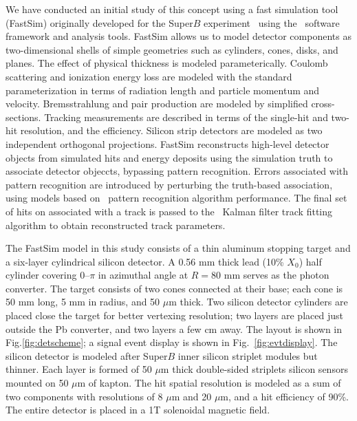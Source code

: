 We have conducted an initial study of this concept using a fast simulation
tool (FastSim) originally developed for the Super$B$ experiment~\cite{SuperB}
using the \babar\
software framework and analysis tools. FastSim allows us to model detector 
components as two-dimensional shells of simple geometries such as cylinders,
cones, disks, and planes. The effect of physical thickness is modeled
parameterically. Coulomb scattering and ionization energy loss are modeled
with the standard parameterization in terms of radiation length and particle
momentum and velocity. Bremsstrahlung and pair production are modeled by
simplified cross-sections. Tracking measurements are described in terms of
the single-hit and two-hit resolution, and the efficiency. Silicon strip
detectors are modeled as two independent orthogonal projections. 
FastSim reconstructs high-level detector objects from simulated hits and
energy deposits using the simulation truth to associate detector objeccts,
bypassing pattern recognition. Errors associated with pattern recognition are
introduced by perturbing the truth-based association, using models based on
\babar\ pattern recognition algorithm performance. The final set of hits on
associated with a track is passed to the \babar\ Kalman filter track fitting
algorithm to obtain reconstructed track parameters.

The FastSim model in this study consists of a thin aluminum stopping target 
and a six-layer
cylindrical silicon detector. A 0.56 mm thick lead (10\% $X_0$) half cylinder 
covering 0--$\pi$ in azimuthal angle at $R = 80$ mm serves as the photon converter.
The target consists of two cones connected at their base; each cone is 50 mm 
long, 5 mm in radius, and 50 $\mu$m thick. Two silicon detector cylinders are
placed close the target for better vertexing resolution; two layers are placed
just outside the Pb converter, and two layers a few cm away. The layout is shown
in Fig.\ref{fig:detscheme}; a signal event display is shown in 
Fig.~\ref{fig:evtdisplay}. The silicon detector is modeled after Super$B$ 
inner silicon striplet modules but thinner. Each layer is formed of 50 $\mu$m thick 
double-sided striplets silicon sensors mounted on 50 $\mu$m of kapton. 
The hit spatial resolution is modeled as a sum of two components with resolutions
of 8 $\mu$m and 20 $\mu$m, and a hit efficiency of 90\%.
The entire detector is placed in a 1T solenoidal
magnetic field.


